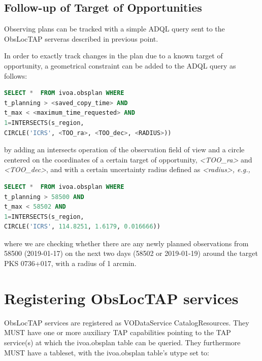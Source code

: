 \documentclass[11pt,a4paper]{ivoa}
\begin{document}
\subsection{Follow-up of Target of Opportunities}
Observing plans can be tracked with a simple ADQL query sent to the ObsLocTAP serveras 
described in previous point.
\par

In order to exactly track changes in the plan due to a known target of opportunity, a 
geometrical constraint can be added to the ADQL query as follows:

\begin{lstlisting}[language=SQL]
SELECT *  FROM ivoa.obsplan WHERE
t_planning > <saved_copy_time> AND
t_max < <maximum_time_requested> AND
1=INTERSECTS(s_region, 
CIRCLE('ICRS', <TOO_ra>, <TOO_dec>, <RADIUS>))
\end{lstlisting}

by adding an intersects operation of the observation field of view and a circle centered on the coordinates of a certain target of opportunity, \textit{<TOO\_ra>} and \textit{<TOO\_dec>}, and with a certain uncertainty radius defined as \textit{<radius>, e.g.,}

\begin{lstlisting}[language=SQL]
SELECT *  FROM ivoa.obsplan WHERE
t_planning > 58500 AND
t_max < 58502 AND
1=INTERSECTS(s_region, 
CIRCLE('ICRS', 114.8251, 1.6179, 0.016666))
\end{lstlisting}
where we are checking whether there are any newly planned observations from 58500 (2019-01-17) on the next two days (58502 or 2019-01-19) around the target PKS 0736+017, with a radius of 1 arcmin.
\par


\section{Registering ObsLocTAP services}

ObsLocTAP services are registered as VODataService CatalogResources. They MUST have 
one or more auxiliary TAP capabilities pointing to the TAP service(s) at which the 
ivoa.obsplan table can be queried. They furthermore MUST have a tableset, with the 
ivoa.obsplan table's utype set to:
\end{document}

